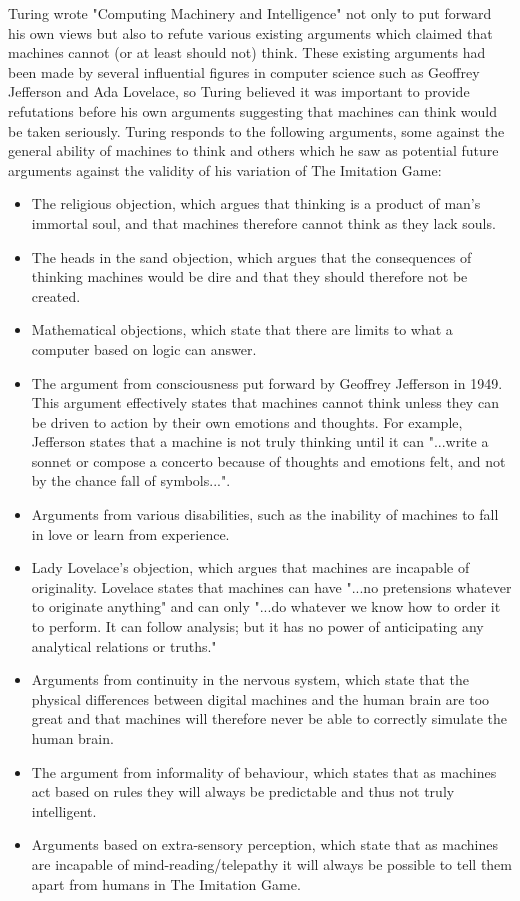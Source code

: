 \documentclass{article}
\begin{document}
\begin{flushleft}
Turing wrote "Computing Machinery and Intelligence" not only to put forward his own views but also to refute various existing arguments which claimed that machines cannot (or at least should not) think. These existing arguments had been made by several influential figures in computer science such as Geoffrey Jefferson and Ada Lovelace, so Turing believed it was important to provide refutations before his own arguments suggesting that machines can think would be taken seriously.
\break
\break
Turing responds to the following arguments, some against the general ability of machines to think and others which he saw as potential future arguments against the validity of his variation of The Imitation Game:
\begin{itemize}
\item The religious objection, which argues that thinking is a product of man's immortal soul, and that machines therefore cannot think as they lack souls.
\item The heads in the sand objection, which argues that the consequences of thinking machines would be dire and that they should therefore not be created.
\item Mathematical objections, which state that there are limits to what a computer based on logic can answer.
\item The argument from consciousness put forward by Geoffrey Jefferson in 1949. This argument effectively states that machines cannot think unless they can be driven to action by their own emotions and thoughts. For example, Jefferson states that a machine is not truly thinking until it can "...write a sonnet or compose a concerto because of thoughts and emotions felt, and not by the chance fall of symbols...".\cite{jefferson1949_BMJ}
\item Arguments from various disabilities, such as the inability of machines to fall in love or learn from experience.
\item Lady Lovelace's objection, which argues that machines are incapable of originality. Lovelace states that machines can have "...no pretensions whatever to originate anything" and can only "...do whatever we know how to order it to perform. It can follow analysis; but it has no power of anticipating any analytical relations or truths."\cite{lovelace1843_notes}
\item Arguments from continuity in the nervous system, which state that the physical differences between digital machines and the human brain are too great and that machines will therefore never be able to correctly simulate the human brain.
\item The argument from informality of behaviour, which states that as machines act based on rules they will always be predictable and thus not truly intelligent.
\item Arguments based on extra-sensory perception, which state that as machines are incapable of mind-reading/telepathy it will always be possible to tell them apart from humans in The Imitation Game.
\end{itemize}


\end{flushleft}
\end{document}
